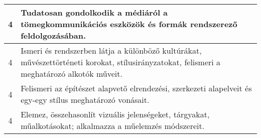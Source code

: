 \begin{longtable}{c | p{12cm} }
                                
                                          4 &  Tudatosan gondolkodik a médiáról a tömegkommunikációs eszközök és formák rendszerező feldolgozásában. \\ \hline
                                          4 &  Ismeri és rendszerben látja a különböző kultúrákat, művészettörténeti korokat, stílusirányzatokat, felismeri a meghatározó alkotók műveit. \\ \hline
                                          4 &  Felismeri az építészet alapvető elrendezési, szerkezeti alapelveit és egy-egy stílus meghatározó vonásait. \\ \hline
                                          4 &  Elemez, összehasonlít vizuális jelenségeket, tárgyakat, műalkotásokat; alkalmazza a műelemzés módszereit. \\ \hline
                                      
                        \end{longtable}
            \clearpage

    



